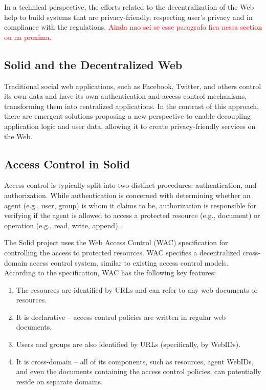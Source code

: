 \documentclass[sigconf]{acmart}
\begin{document}
In a technical perspective, the efforts related to the decentralization of the Web help to build systems that are privacy-friendly, respecting user's privacy and in compliance with the regulations.
\textcolor{red}{Ainda nao sei se esse paragrafo fica nessa section ou na proxima.}

\subsection{Solid and the Decentralized Web}
Traditional social web applications, such as Facebook, Twitter, and others control its own data and have its own authentication and access control mechanisms, transforming them into centralized applications. In the contrast of this approach, there are emergent solutions proposing a new perspective to enable decoupling application logic and user data, allowing it to create privacy-friendly services on the Web.



\subsection{Access Control in Solid}

Access control is typically split into two distinct procedures: authentication, and authorization. While authentication is concerned with determining whether an agent (e.g., user, group) is whom it claims to be, authorization is responsible for verifying if the agent is allowed to access a protected resource (e.g., document) or operation (e.g., read, write, append).

The Solid project uses the Web Access Control (WAC) specification for controlling the access to protected resources. WAC specifies a decentralized cross-domain access control system, similar to existing access control models. According to the specification, WAC has the following key features:

\begin{enumerate}
\item The resources are identified by URLs and can refer to any web documents or resources.
\item It is declarative -- access control policies are written in regular web documents.
\item Users and groups are also identified by URLs (specifically, by WebIDs).
\item It is cross-domain -- all of its components, such as resources, agent WebIDs, and even the documents containing the access control policies, can potentially reside on separate domains.
\end{enumerate}
\end{document}

